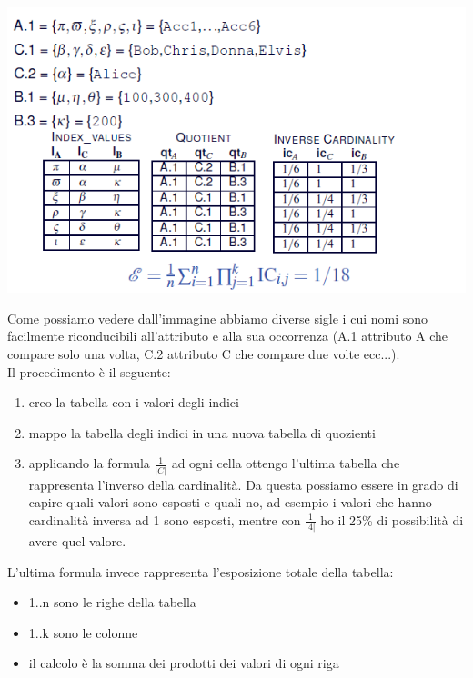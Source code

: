 \begin{center}
    \includegraphics[scale=0.6]{img/quottable.png}
\end{center}
Come possiamo vedere dall'immagine abbiamo diverse sigle i cui nomi sono facilmente riconducibili all'attributo e alla sua occorrenza (A.1 attributo A che compare solo una volta, C.2 attributo C che compare due volte ecc...).\\
Il procedimento è il seguente:
\begin{enumerate}
    \item creo la tabella con i valori degli indici
    \item mappo la tabella degli indici in una nuova tabella di quozienti
    \item applicando la formula \( \frac{1}{|C|}\) ad ogni cella ottengo l'ultima tabella che rappresenta l'inverso della cardinalità. Da questa possiamo essere in grado di capire quali valori sono esposti e quali no, ad esempio i valori che hanno cardinalità inversa ad 1 sono esposti, mentre con  \( \frac{1}{|4|}\) ho il 25\% di possibilità di avere quel valore.
\end{enumerate}
L'ultima formula invece rappresenta l'esposizione totale della tabella:
\begin{itemize}
    \item 1..n sono le righe della tabella
    \item 1..k sono le colonne
    \item il calcolo è la somma dei prodotti dei valori di ogni riga
\end{itemize}

